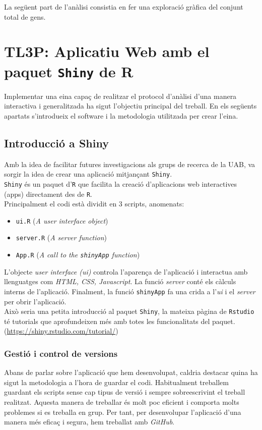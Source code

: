 \documentclass[english]{article}
\begin{document}
La següent part de l'anàlisi consistia en fer una exploració gràfica del conjunt total de gens.


\clearpage
\section{TL3P: Aplicatiu Web amb el paquet \texttt{Shiny} de R}
Implementar una eina capa\c{c} de realitzar el protocol d'anàlisi d'una manera interactiva i generalitzada ha sigut l'objectiu principal del treball. En els següents apartats s'introdueix el software i la metodologia utilitzada per crear l'eina.
\subsection{Introducció a Shiny}
Amb la idea de facilitar futures investigacions als grups de recerca de la UAB, va sorgir la idea de crear una aplicació mitjan\c{c}ant \texttt{Shiny}.
\\

\texttt{Shiny} és un paquet d'\texttt{R} que facilita la creació d'aplicacions web interactives (apps) directament des de \texttt{R}.
\\

Principalment el codi està dividit en 3 scripts, anomenats:
\begin{itemize}
\item \texttt{ui.R} (\textit{A user interface object})
\item \texttt{server.R} (\textit{A server function})
\item \texttt{App.R} (\textit{A call to the \texttt{shinyApp} function})
\end{itemize}
L'objecte \textit{user interface (ui)} controla l'aparen\c{c}a de l'aplicació i interactua amb llenguatges com \textit{HTML, CSS, Javascript}. La funció \textit{server} conté els càlculs interns de l'aplicació. Finalment, la funció \texttt{shinyApp} fa una crida a l'\textit{ui} i el \textit{server} per obrir l'aplicació.
\\

Això seria una petita introducció al paquet \texttt{Shiny}, la mateixa pàgina de \texttt{Rstudio} té tutorials que aprofundeixen més amb totes les funcionalitats del paquet. (\url{https://shiny.rstudio.com/tutorial/})

\subsubsection{Gestió i control de versions}
Abans de parlar sobre l'aplicació que hem desenvolupat, caldria destacar quina ha sigut la metodologia a l'hora de guardar el codi. Habitualment treballem guardant els scripts sense cap tipus de versió i sempre sobreescrivint el treball realitzat. Aquesta manera de treballar és molt poc eficient i comporta molts problemes si es treballa en grup. Per tant, per desenvolupar l'aplicació d'una manera més efica\c{c} i segura, hem treballat amb \textit{GitHub}.
\\
\end{document}
